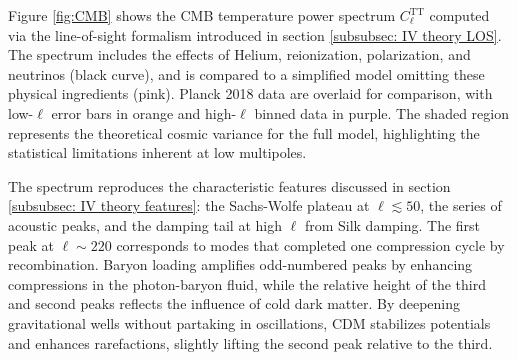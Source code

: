 \documentclass{aa}
\numberwithin{equation}{section}
\numberwithin{table}{section}
\numberwithin{figure}{section}
\begin{document}
Figure \ref{fig:CMB} shows the CMB temperature power spectrum $C_\ell^\text{TT}$ computed via the line-of-sight formalism introduced in section \ref{subsubsec: IV theory LOS}. The spectrum includes the effects of Helium, reionization, polarization, and neutrinos (black curve), and is compared to a simplified model omitting these physical ingredients (pink). Planck 2018 data are overlaid for comparison, with low-$\ell$ error bars in orange and high-$\ell$ binned data in purple. The shaded region represents the theoretical cosmic variance for the full model, highlighting the statistical limitations inherent at low multipoles.


The spectrum reproduces the characteristic features discussed in section \ref{subsubsec: IV theory features}: the Sachs-Wolfe plateau at $\ell \lesssim 50$, the series of acoustic peaks, and the damping tail at high $\ell$ from Silk damping. The first peak at $\ell \sim 220$ corresponds to modes that completed one compression cycle by recombination. Baryon loading amplifies odd-numbered peaks by enhancing compressions in the photon-baryon fluid, while the relative height of the third and second peaks reflects the influence of cold dark matter. By deepening gravitational wells without partaking in oscillations, CDM stabilizes potentials and enhances rarefactions, slightly lifting the second peak relative to the third.
\end{document}
